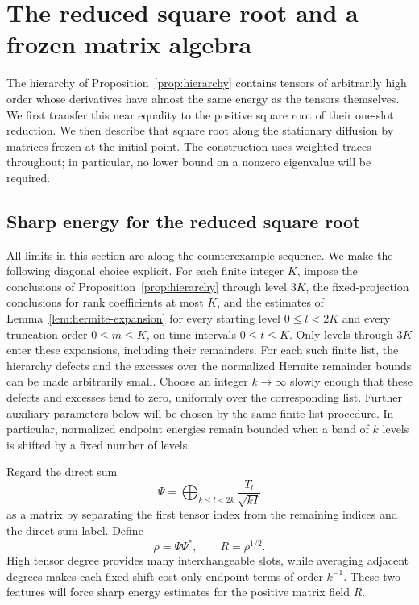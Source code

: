 \section{The reduced square root and a frozen matrix algebra}\label{sec:matrices}

The hierarchy of Proposition~\ref{prop:hierarchy} contains tensors of
arbitrarily high order whose derivatives have almost the same energy as the
tensors themselves.  We first transfer this near equality to the positive
square root of their one-slot reduction.  We then describe that square root
along the stationary diffusion by matrices frozen at the initial point.
The construction uses weighted traces throughout; in particular, no lower
bound on a nonzero eigenvalue will be required.

\subsection{Sharp energy for the reduced square root}

All limits in this section are along the counterexample sequence.  We make
the following diagonal choice explicit.  For each finite integer $K$, impose
the conclusions of Proposition~\ref{prop:hierarchy} through level $3K$, the
fixed-projection conclusions for rank coefficients at most $K$, and the
estimates of Lemma~\ref{lem:hermite-expansion} for every starting level
$0\le l<2K$ and every truncation order $0\le m\le K$, on time
intervals $0\le t\le K$.  Only levels through $3K$ enter these
expansions, including their remainders.  For each such finite list, the
hierarchy defects and the excesses over the normalized Hermite remainder
bounds can be made arbitrarily small.  Choose an integer $k\to\infty$
slowly enough that these defects and excesses tend to zero, uniformly over
the corresponding list.  Further auxiliary parameters below will be chosen
by the same finite-list procedure.  In particular, normalized endpoint
energies remain bounded when a band of $k$ levels is shifted by a fixed
number of levels.

Regard the direct sum
\[
 \Psi=\bigoplus_{k\le l<2k}\frac{T_l}{\sqrt{kI}}
\]
as a matrix by separating the first tensor index from the remaining
indices and the direct-sum label.  Define
\begin{equation}\label{eq:matrix-reduction}
 \rho=\Psi\Psi^*,\qquad R=\rho^{1/2}.
\end{equation}
High tensor degree provides many interchangeable slots, while averaging
adjacent degrees makes each fixed shift cost only endpoint terms of
order $k^{-1}$.  These two features will force sharp energy estimates
for the positive matrix field $R$.

